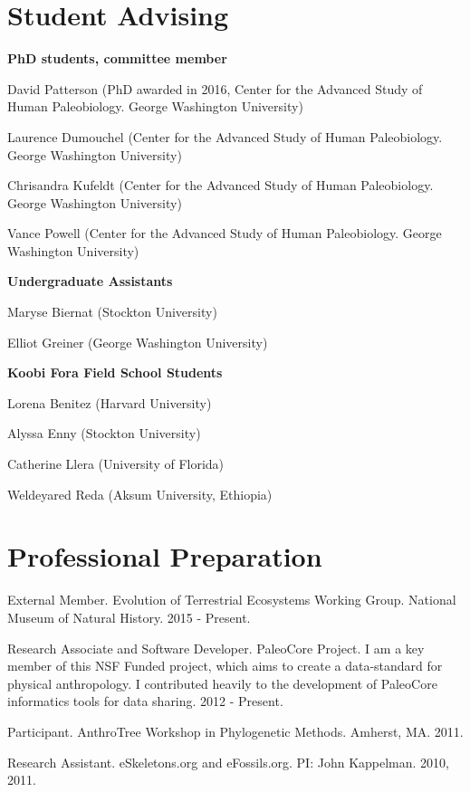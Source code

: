 \documentclass{article}
\begin{document}
\section*{Student Advising}
\begin{description*}
\item[] {\bfseries PhD students, committee member}
\item[] David Patterson (PhD awarded in 2016, Center for the Advanced Study of Human Paleobiology. George Washington University)
\item[] Laurence Dumouchel (Center for the Advanced Study of Human Paleobiology. George Washington University)
\item[] Chrisandra Kufeldt (Center for the Advanced Study of Human Paleobiology. George Washington University)
\item[] Vance Powell (Center for the Advanced Study of Human Paleobiology. George Washington University)
\end{description*}

\begin{description*}
\item[] {\bfseries Undergraduate Assistants}
\item[] Maryse Biernat (Stockton University)
\item[] Elliot Greiner (George Washington University)
\end{description*}

\begin{description*}
\item[] {\bfseries Koobi Fora Field School Students}
\item[] Lorena Benitez (Harvard University)
\item[] Alyssa Enny (Stockton University)
\item[] Catherine Llera (University of Florida)
\item[] Weldeyared Reda (Aksum University, Ethiopia)
\end{description*}

\section*{Professional Preparation}
\begin{description*}

\item[] External Member. Evolution of Terrestrial Ecosystems Working Group. National Museum of Natural History. 2015 - Present.

\item[] Research Associate and Software Developer. PaleoCore Project. I am a key member of this NSF Funded project, which aims to create a data-standard for physical anthropology. I contributed heavily to the development of PaleoCore informatics tools for data sharing. 2012 - Present.

\item[] Participant. AnthroTree Workshop in Phylogenetic Methods. Amherst, MA. 2011.

\item[] Research Assistant. eSkeletons.org and eFossils.org. PI: John Kappelman. 2010, 2011.

\end{description*}
\end{document}
